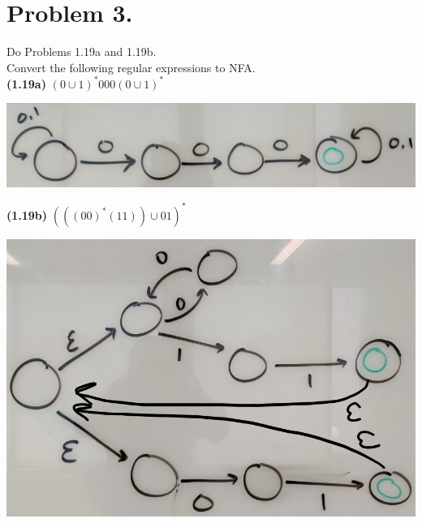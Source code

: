 \documentclass[11pt]{article}
\begin{document}
\newpage




\section*{Problem 3.}
Do Problems 1.19a and 1.19b.\\
Convert the following regular expressions to NFA.\\

\textbf{(1.19a)} $(0\cup 1)^* 000 (0\cup 1)^*$
\begin{center}
    \includegraphics[width = 0.9\linewidth]{images/homework02/answer1.19a.jpg}
\end{center}

\textbf{(1.19b)} $(((00)^*(11))\cup 01)^*$
\begin{center}
    \includegraphics[width = 0.7\linewidth]{images/homework02/answer1.19b.jpg}
\end{center}

\newpage
\end{document}
